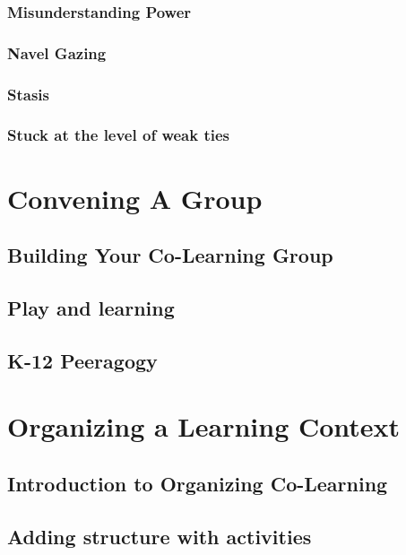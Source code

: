 \documentclass[ebook, 12pt, twoside]{memoir}
\begin{document}
\section*{Misunderstanding Power}

\section*{Navel Gazing}

\section*{Stasis}

\section*{Stuck at the level of weak ties}



\part{Convening A Group} %
%
\chapter[\textbf{Convening}]{Building Your Co-Learning Group}

%
\chapter[\textbf{Play and learning}]{Play and learning}
%

%
\chapter[\textbf{K-12 Peeragogy}]{K-12 Peeragogy}
%




\part{Organizing a Learning Context} %
%
\chapter[\textbf{Organizing Co-Learning}]{Introduction to Organizing Co-Learning}

%
\chapter[\textbf{Adding structure}]{Adding structure with activities}
%

%
\end{document}
